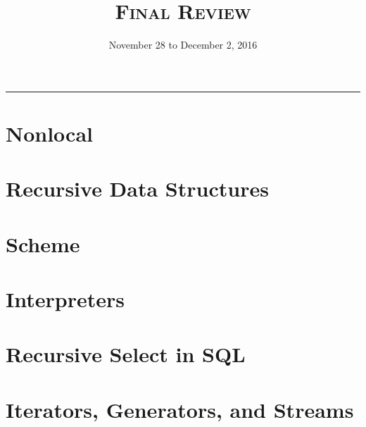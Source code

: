 \documentclass{exam}
\title{\textsc{Final Review}}
\date{November 28 to December 2, 2016}
\begin{document}
\maketitle
\rule{\textwidth}{0.15em}
\fontsize{12}{15}\selectfont


\section{Nonlocal}

\begin{questions}
    {}

\section{Recursive Data Structures}
    {}
    \newpage
    {}
    {}

\newpage
\section{Scheme}
    {}

\section{Interpreters}
    {}

\section{Recursive Select in SQL}
    {}

\newpage
\section{Iterators, Generators, and Streams}
    {}
    \newpage
    {}
    \newpage
    {}
\end{questions}

\end{document}
